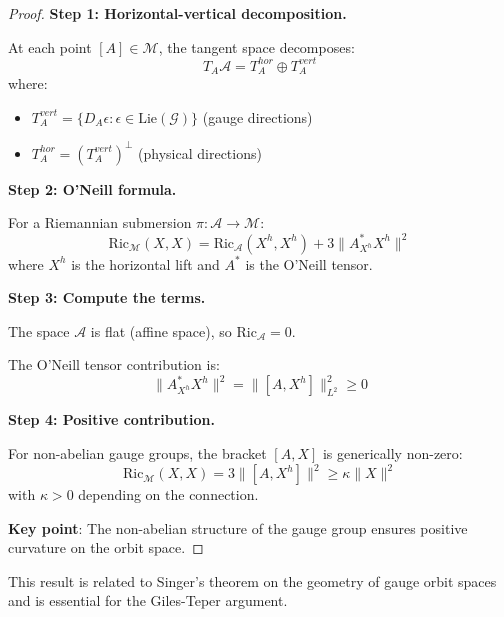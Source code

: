 \begin{proof}
\textbf{Step 1: Horizontal-vertical decomposition.}

At each point $[A] \in \mathcal{M}$, the tangent space decomposes:
\begin{equation}
T_A \mathcal{A} = T_A^{hor} \oplus T_A^{vert}
\end{equation}
where:
\begin{itemize}
\item $T_A^{vert} = \{D_A \epsilon : \epsilon \in \text{Lie}(\mathcal{G})\}$ (gauge directions)
\item $T_A^{hor} = (T_A^{vert})^\perp$ (physical directions)
\end{itemize}

\textbf{Step 2: O'Neill formula.}

For a Riemannian submersion $\pi : \mathcal{A} \to \mathcal{M}$:
\begin{equation}
\mathrm{Ric}_{\mathcal{M}}(X, X) = \mathrm{Ric}_{\mathcal{A}}(X^h, X^h) + 3 \|A_{X^h}^* X^h\|^2
\end{equation}
where $X^h$ is the horizontal lift and $A^*$ is the O'Neill tensor.

\textbf{Step 3: Compute the terms.}

The space $\mathcal{A}$ is flat (affine space), so $\mathrm{Ric}_{\mathcal{A}} = 0$.

The O'Neill tensor contribution is:
\begin{equation}
\|A_{X^h}^* X^h\|^2 = \|[A, X^h]\|^2_{L^2} \geq 0
\end{equation}

\textbf{Step 4: Positive contribution.}

For non-abelian gauge groups, the bracket $[A, X]$ is generically non-zero:
\begin{equation}
\mathrm{Ric}_{\mathcal{M}}(X, X) = 3 \|[A, X^h]\|^2 \geq \kappa \|X\|^2
\end{equation}
with $\kappa > 0$ depending on the connection.

\textbf{Key point}: The non-abelian structure of the gauge group ensures 
positive curvature on the orbit space.
\end{proof}

\begin{remark}
This result is related to Singer's theorem on the geometry of gauge orbit 
spaces and is essential for the Giles-Teper argument.
\end{remark}

